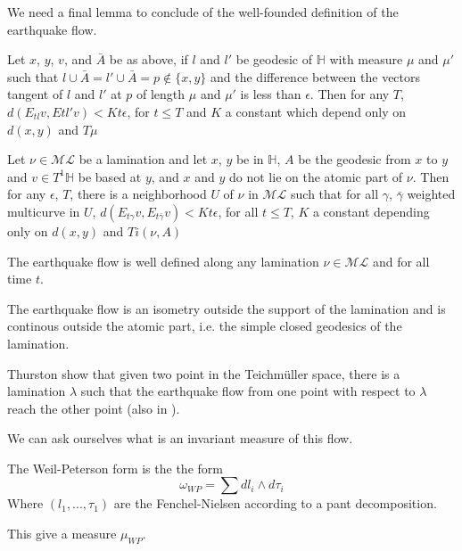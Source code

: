 We need a final lemma to conclude of the well-founded definition of the earthquake flow.

\begin{lem}
Let $x$, $y$, $v$, and $\bar{A}$ be as above, if $l$ and $l'$ be geodesic of $\mathbb{H}$ with measure $\mu$ and $\mu'$ such that $l \cup \bar{A} = l' \cup \bar{A}=p \notin \{x,y\}$ and the difference between the vectors tangent of $l$ and $l'$ at $p$ of length $\mu$ and $\mu'$ is less than 
$\epsilon$.
Then for any $T$, $d(E_{t l}v,E{t l'}v)<Kt \epsilon $, for $t \leq T$ and $K$ a constant which depend only on $d(x,y)$ and $T \mu$
\end{lem}

\begin{prop}
Let $\nu \in \mathcal{ML}$ be a lamination and let $x$, $y$ be in $\mathbb{H}$, $A$ be the geodesic from $x$ to $y$ and $v\in T^1 \mathbb{H}$ be based at $y$, and $x$ and $y$ do not lie on the atomic part of $\nu$. Then for any $\epsilon$, $T$, there is a neighborhood $U$ of $\nu$ in $\mathcal{ML}$ such that for all
$\gamma$, $\bar{\gamma}$ weighted multicurve in $U$, $d(E_{t \gamma}v,E_{t \bar{\gamma}}v) < K t \epsilon$, for all $t \leq T$, $K$ a constant depending only on $d(x,y)$ and $T i(\nu,A)$
\end{prop}


\begin{cor}
The earthquake flow is well defined along any lamination $\nu \in \mathcal{ML}$ and for all time $t$.
\end{cor}

\begin{rmq}
The earthquake flow is an isometry outside the support of the lamination and is continous outside the atomic part, i.e. the simple closed geodesics of the lamination.
\end{rmq}

Thurston show that given two point in the Teichmüller space, there is a lamination $\lambda$ such that the earthquake flow from one point with respect to $\lambda$ reach the other point (also in \cite{NielsenRealizationPro}).

We can ask ourselves what is an invariant measure of this flow.

\begin{dfnt}
The Weil-Peterson form is the the form \[
\omega_{WP} = \sum d l_i \wedge d \tau_i
\]
Where $(l_1,...,\tau_1)$ are the Fenchel-Nielsen according to a pant decomposition.

This give a measure $\mu_{WP}$.
\end{dfnt}


